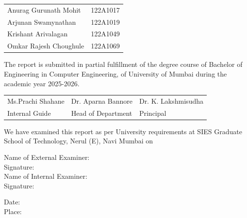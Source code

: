 \documentclass[12pt,a4paper]{report}
\begin{document}
\begin{center}
\begin{tabular}{ll}
    Anurag Gurunath Mohit \hfill & 122A1017 \\
    Arjunan Swamynathan \hfill & 122A1019 \\
    Krishant Arivalagan \hfill & 122A1049 \\
    Omkar Rajesh Choughule \hfill & 122A1069 \\
\end{tabular}
\end{center}
\vspace{0.3cm}
The report is submitted in partial fulfillment of the degree course of Bachelor of Engineering in Computer Engineering, of University of Mumbai during the academic year 2025-2026.

\begin{center}
\begin{tabular}{>{\centering\arraybackslash}p{5cm} >{\centering\arraybackslash}p{5cm} >{\centering\arraybackslash}p{5cm}}
    Ms.Prachi Shahane & Dr. Aparna Bannore & Dr. K. Lakshmisudha \\
    Internal Guide & Head of Department & Principal \\
\end{tabular}
\end{center}
We have examined this report as per University requirements at SIES Graduate School of Technology, Nerul (E), Navi Mumbai on \underline{\hspace{5cm}} \\


\begin{flushright}
Name of External Examiner: \underline{\hspace{5cm}} \\
\vspace{0.5cm}
Signature: \underline{\hspace{5cm}} \\[1cm]

Name of Internal Examiner: \underline{\hspace{5cm}} \\
\vspace{0.5cm}
Signature: \underline{\hspace{5cm}}
\end{flushright}

\vspace{1cm}

\noindent
Date: \\
Place:
\newpage
\end{document}

